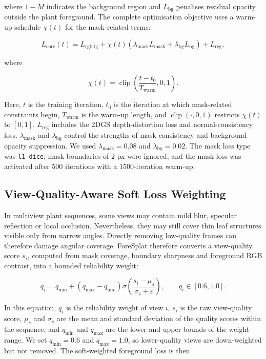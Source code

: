 \documentclass[a4paper]{cas-sc}
\begin{document}
where \(1-M\) indicates the background region and \(L_{\text{bg}}\) penalises residual opacity outside the plant foreground. The complete optimisation objective uses a warm-up schedule \(\chi(t)\) for the mask-related terms:

\[
L_{\text{core}}(t)=
L_{\text{rgb-fg}}+
\chi(t)\left(\lambda_{\text{mask}}L_{\text{mask}}
+\lambda_{\text{bg}}L_{\text{bg}}\right)+L_{\text{reg}},
\]

where

\[
\chi(t)=\operatorname{clip}\left(\frac{t-t_0}{T_{\text{warm}}},0,1\right).
\]

Here, \(t\) is the training iteration, \(t_0\) is the iteration at which mask-related constraints begin, \(T_{\text{warm}}\) is the warm-up length, and \(\operatorname{clip}(\cdot,0,1)\) restricts \(\chi(t)\) to \([0,1]\). \(L_{\text{reg}}\) includes the 2DGS depth-distortion loss and normal-consistency loss. \(\lambda_{\text{mask}}\) and \(\lambda_{\text{bg}}\) control the strengths of mask consistency and background opacity suppression. We used \(\lambda_{\text{mask}}=0.08\) and \(\lambda_{\text{bg}}=0.02\). The mask loss type was \texttt{l1\_dice}, mask boundaries of 2 px were ignored, and the mask loss was activated after 500 iterations with a 1500-iteration warm-up.

\subsection{View-Quality-Aware Soft Loss Weighting}\label{sec:view-quality-aware-soft-loss-weighting}

In multiview plant sequences, some views may contain mild blur, specular reflection or local occlusion. Nevertheless, they may still cover thin leaf structures visible only from narrow angles. Directly removing low-quality frames can therefore damage angular coverage. ForeSplat therefore converts a view-quality score \(s_i\), computed from mask coverage, boundary sharpness and foreground RGB contrast, into a bounded reliability weight:

\[
q_i=q_{\min}+(q_{\max}-q_{\min})
\sigma\left(\frac{s_i-\mu_s}{\sigma_s+\varepsilon}\right),
\qquad q_i\in[0.6,1.0].
\]

In this equation, \(q_i\) is the reliability weight of view \(i\), \(s_i\) is the raw view-quality score, \(\mu_s\) and \(\sigma_s\) are the mean and standard deviation of the quality scores within the sequence, and \(q_{\min}\) and \(q_{\max}\) are the lower and upper bounds of the weight range. We set \(q_{\min}=0.6\) and \(q_{\max}=1.0\), so lower-quality views are down-weighted but not removed. The soft-weighted foreground loss is then
\end{document}
